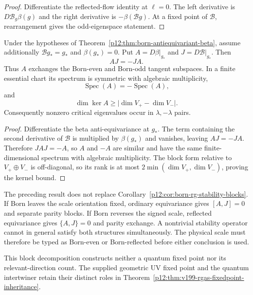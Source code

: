 \documentclass[12pt,a4paper]{article}
\begin{document}
\begin{proof}
Differentiate the reflected-flow identity at $\ell=0$.  The left derivative is
$D\mathcal B_g\beta(g)$ and the right derivative is $-\beta(\mathcal Bg)$.
At a fixed point of $\mathcal B$, rearrangement gives the odd-eigenspace
statement.
\end{proof}

\begin{corollary}
\label{p12:cor:born-reflected-stability-anticommutation}
Under the hypotheses of Theorem~\ref{p12:thm:born-antiequivariant-beta},
assume additionally $\mathcal Bg_*=g_*$ and $\beta(g_*)=0$.  Put
$A=D\beta|_{g_*}$ and $J=D\mathcal B|_{g_*}$.  Then
\[
 \boxed{AJ=-JA.}
\]
Thus $A$ exchanges the Born-even and Born-odd tangent subspaces.  In a finite
essential chart its spectrum is symmetric with algebraic multiplicity,
\[
 \boxed{\operatorname{Spec}(A)=-\operatorname{Spec}(A)},
\]
and
\[
 \dim\ker A\ge\bigl|\dim V_+-\dim V_-\bigr|.
\]
Consequently nonzero critical eigenvalues occur in $\lambda,-\lambda$ pairs.
\end{corollary}

\begin{proof}
Differentiate the beta anti-equivariance at $g_*$.  The term containing the
second derivative of $\mathcal B$ is multiplied by $\beta(g_*)$ and vanishes,
leaving $AJ=-JA$.  Therefore $JAJ=-A$, so $A$ and $-A$ are similar and have
the same finite-dimensional spectrum with algebraic multiplicity.  The block
form relative to $V_+\oplus V_-$ is off-diagonal, so its rank is at most
$2\min(\dim V_+,\dim V_-)$, proving the kernel bound.
\end{proof}

\begin{remark}
\label{p12:rem:two-born-rg-types}
The preceding result does not replace
Corollary~\ref{p12:cor:born-rg-stability-blocks}.  If Born leaves the scale
orientation fixed, ordinary equivariance gives $[A,J]=0$ and separate parity
blocks.  If Born reverses the signed scale, reflected equivariance gives
$\{A,J\}=0$ and parity exchange.  A nontrivial stability operator cannot in
general satisfy both structures simultaneously.  The physical scale must
therefore be typed as Born-even or Born-reflected before either conclusion is
used.
\end{remark}

This block decomposition constructs neither a quantum fixed point nor its
relevant-direction count. The supplied geometric UV fixed point and the
quantum intertwiner retain their distinct roles in
Theorem~\ref{p12:thm:v199-rgas-fixedpoint-inheritance}.
\end{document}
